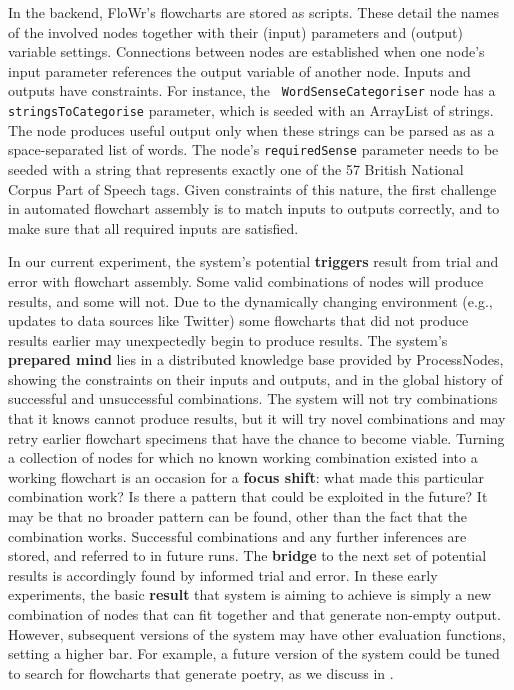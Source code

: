 In the backend, {\sf FloWr}'s flowcharts are stored as scripts.  These
detail the names of the involved nodes together with their (input)
parameters and (output) variable settings.  Connections between nodes
are established when one node's input parameter references the output
variable of another node.
%
Inputs and outputs have constraints.  For instance, the {\tt
  WordSenseCategoriser} node has a {\tt stringsToCategorise}
parameter, which is seeded with an ArrayList of strings.  The node
produces useful output only when these strings can be parsed as as a
space-separated list of words.  The node's {\tt requiredSense}
parameter needs to be seeded with a string that represents exactly one
of the 57 British National Corpus Part of Speech tags.  Given
constraints of this nature, the first challenge in automated flowchart
assembly is to match inputs to outputs correctly, and to make sure
that all required inputs are satisfied.

In our current experiment, the system's potential \textbf{triggers}
result from trial and error with flowchart assembly.  Some valid
combinations of nodes will produce results, and some will not.  Due to
the dynamically changing environment (e.g., updates to data sources
like Twitter) some flowcharts that did not produce results earlier may
unexpectedly begin to produce results.
%
The system's \textbf{prepared mind} lies in a distributed knowledge
base provided by ProcessNodes, showing the constraints on their inputs
and outputs, and in the global history of successful and unsuccessful
combinations.
%
The system will not try combinations that it knows cannot produce
results, but it will try novel combinations and may retry earlier
flowchart specimens that have the chance to become viable.  Turning a
collection of nodes for which no known working combination existed
into a working flowchart is an occasion for a \textbf{focus shift}:
what made this particular combination work?  Is there a pattern that
could be exploited in the future?  It may be that no broader pattern
can be found, other than the fact that the combination works.
%
Successful combinations and any further inferences are stored, and
referred to in future runs.  The \textbf{bridge} to the next set of
potential results is accordingly found by informed trial and error.
%
In these early experiments, the basic \textbf{result} that system is
aiming to achieve is simply a new combination of nodes that can fit
together and that generate non-empty output.  However, subsequent
versions of the system may have other evaluation functions, setting a
higher bar.  For example, a future version of the system could be
tuned to search for flowcharts that generate poetry, as we discuss in
\cite{corneli2015computational}.

